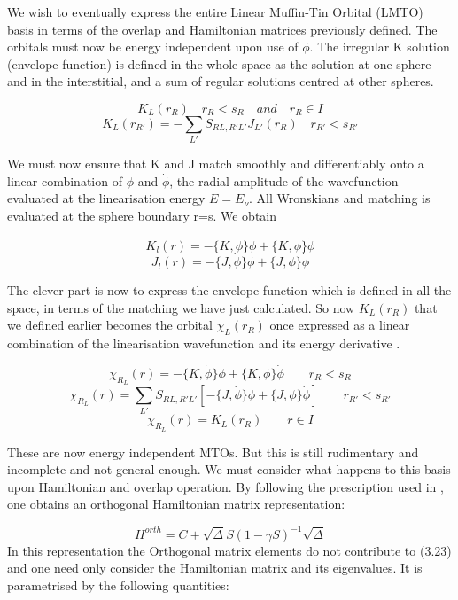\documentclass[12pt]{article}
\begin{document}
We wish to eventually express the entire Linear Muffin-Tin Orbital (LMTO) basis in terms of the overlap and Hamiltonian matrices previously defined. The orbitals must now be energy independent upon use of $\phi$. The irregular K solution (envelope function) is defined in the whole space as the solution at one sphere and in the interstitial, and a sum of regular solutions centred at other spheres.

\begin{equation} \label{3.20} \tag{3.25}
K_L(r_R) \quad r_R<s_R \quad and \quad r_R\in I
\end{equation}
\begin{equation} \label{3.20} \tag{3.26}
K_L(r_{R'})= - \sum_{L'} S_{RL,R'L'} J_{L'}(r_R) \quad r_{R'}<s_{R'}
\end{equation}


We must now ensure that K and J match smoothly and differentiably onto a linear combination of $\phi$ and $\dot{\phi}$, the radial amplitude of the wavefunction evaluated at the linearisation energy $E=E_\nu$. All Wronskians and matching is evaluated at the sphere boundary r=s. We obtain

$$K_l(r)=-\{ K,\dot{\phi} \}\phi + \{ K,\phi \} \dot{\phi}$$
$$J_l(r)=-\{ J,\dot{\phi} \}\phi + \{ J,\phi \} \dot{\phi}$$

The clever part is now to express the envelope function which is defined in all the space, in terms of the matching we have just calculated. So now $K_L(r_R)$ that we defined earlier becomes the orbital $\chi_L(r_R)$ once expressed as a linear combination of the linearisation wavefunction and its energy derivative \cite{turek}.

$$\chi_R_L(r)= -\{ K,\dot{\phi} \}\phi + \{ K,\phi \} \dot{\phi} \qquad r_R<s_R    $$
$$\chi_R_L(r)= \sum_{L'} S_{RL,R'L'}[-\{ J,\dot{\phi} \}\phi + \{ J,\phi \} \dot{\phi}] \qquad r_{R'}<s_{R'}$$
$$\chi_R_L(r)=K_L(r_R) \qquad r\in I$$

These are now energy independent MTOs. But this is still rudimentary and incomplete and not general enough. We must consider what happens to this basis upon Hamiltonian and overlap operation. By following the prescription used in \cite{turek}, one obtains an orthogonal Hamiltonian matrix representation:

$$H^{orth}=C + \sqrt{\Delta}S(1-\gamma S)^{-1} \sqrt{\Delta}$$
In this representation the Orthogonal matrix elements do not contribute to (3.23) and one need only consider the Hamiltonian matrix and its eigenvalues. It is parametrised by the following quantities: 
\end{document}
